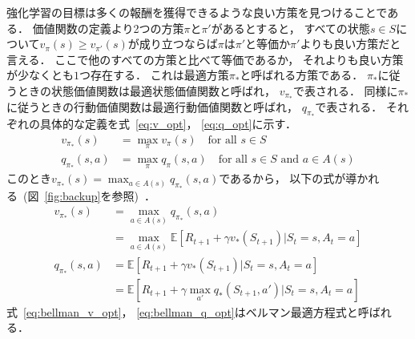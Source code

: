 強化学習の目標は多くの報酬を獲得できるような良い方策を見つけることである．
価値関数の定義より2つの方策$\pi$と$\pi'$があるとすると， すべての状態$s \in S$について$v_\pi(s) \geq v_{\pi'}(s)$が成り立つならば$\pi$は$\pi'$と等価か$\pi'$よりも良い方策だと言える．
ここで他のすべての方策と比べて等価であるか， それよりも良い方策が少なくとも$1$つ存在する．
これは最適方策$\pi_*$と呼ばれる方策である．
$\pi_*$に従うときの状態価値関数は最適状態価値関数と呼ばれ， $v_{\pi_*}$で表される．
同様に$\pi_*$に従うときの行動価値関数は最適行動価値関数と呼ばれ， $q_{\pi_*}$で表される．
それぞれの具体的な定義を式~\ref{eq:v_opt}， \ref{eq:q_opt}に示す．
\begin{align}
  \label{eq:v_opt}
  v_{\pi_*}(s) &= \max_\pi v_{\pi}(s) \quad \text{for all } s \in S \\
  \label{eq:q_opt}
  q_{\pi_*}(s,a) &= \max_\pi q_{\pi}(s, a) \quad \text{for all } s \in S \text{ and } a \in A(s)
\end{align}
このとき$v_{\pi_*}(s) = \max_{a \in A(s)} q_{\pi_*} (s, a)$であるから， 以下の式が導かれる~(図~\ref{fig:backup}を参照)~．
\begin{align}
  v_{\pi_*}(s) &= \max_{a \in A(s)} q_{\pi_*} (s, a) \\
  \label{eq:bellman_v_opt}
               &= \max_{a \in A(s)} \mathbb{E}[R_{t+1} + \gamma v_*(S_{t+1}) | S_t=s, A_t=a] \\
  q_{\pi_*}(s, a) &= \mathbb{E}[R_{t+1} + \gamma v_*(S_{t+1}) | S_t=s, A_t=a] \\
  \label{eq:bellman_q_opt}
                  &= \mathbb{E}[R_{t+1} + \gamma \max_{a'} q_*(S_{t+1}, a') | S_t=s, A_t=a]
\end{align}
式~\ref{eq:bellman_v_opt}， \ref{eq:bellman_q_opt}はベルマン最適方程式と呼ばれる．
